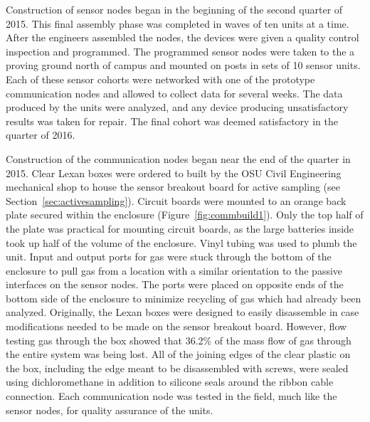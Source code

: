 \documentclass[journal]{IEEEtran}
\begin{document}
Construction of sensor nodes began in the beginning of the second quarter of 2015.   This final assembly phase was completed in waves of ten units at a time.  After the engineers assembled the nodes, the devices were given a quality control inspection and programmed.  The programmed sensor nodes were taken to the a proving ground north of campus and mounted on posts in sets of 10 sensor units.  Each of these sensor cohorts were networked with one of the prototype communication nodes and allowed to collect data for several weeks.  The data produced by the units were analyzed, and any device producing unsatisfactory results was taken for repair.  The final cohort was deemed satisfactory in the  quarter of 2016.

Construction of the communication nodes began near the end of the  quarter in 2015.  Clear Lexan boxes were ordered to built by the OSU Civil Engineering mechanical shop to house the sensor breakout board for active sampling (see Section~\ref{sec:activesampling}).  Circuit boards were mounted to an orange back plate secured within the enclosure (Figure~\ref{fig:commbuild1}).  Only the top half of the plate was practical for mounting circuit boards, as the large batteries inside took up half of the volume of the enclosure.  Vinyl tubing was used to plumb the unit.  Input and output ports for gas were stuck through the bottom of the enclosure to pull gas from a location with a similar orientation to the passive interfaces on the sensor nodes.  The ports were placed on opposite ends of the bottom side of the enclosure to minimize recycling of gas which had already been analyzed.    Originally, the Lexan boxes were designed to easily disassemble in case modifications needed to be made on the sensor breakout board.  However, flow testing gas through the box showed that 36.2\% of the mass flow of gas through the entire system was being lost.  All of the joining edges of the clear plastic on the box, including the edge meant to be disassembled with screws, were sealed using dichloromethane in addition to silicone seals around the ribbon cable connection.  Each communication node was tested in the field, much like the sensor nodes, for quality assurance of the units.  
\end{document}
